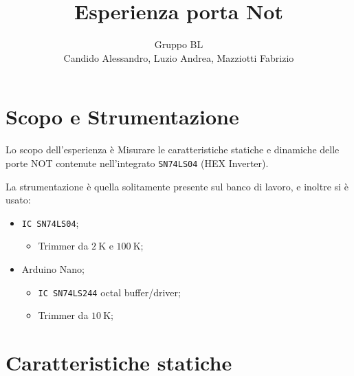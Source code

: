 \documentclass[a4paper,10pt]{article}
\title{Esperienza porta Not} %
\author{Gruppo BL \\ Candido Alessandro, Luzio Andrea, Mazziotti Fabrizio}
\def\code#1{\texttt{#1}}
\begin{document}
\maketitle


\section{Scopo e Strumentazione}
Lo scopo dell'esperienza è Misurare le caratteristiche statiche e dinamiche delle porte NOT contenute nell’integrato \code{SN74LS04} (HEX Inverter).

La strumentazione è quella solitamente presente sul banco di lavoro, e inoltre si è usato:
\begin{itemize}
	\item \code{IC SN74LS04};
	\begin{itemize}
		\item Trimmer da $2~$K e $100~$K;
	\end{itemize}
	\item Arduino Nano; 
	\begin{itemize}
		\item \code{IC SN74LS244} octal buffer/driver; 
		\item Trimmer da $10~$K;
	\end{itemize}
\end{itemize}

%
%
%

\section{Caratteristiche statiche}
\end{document}
